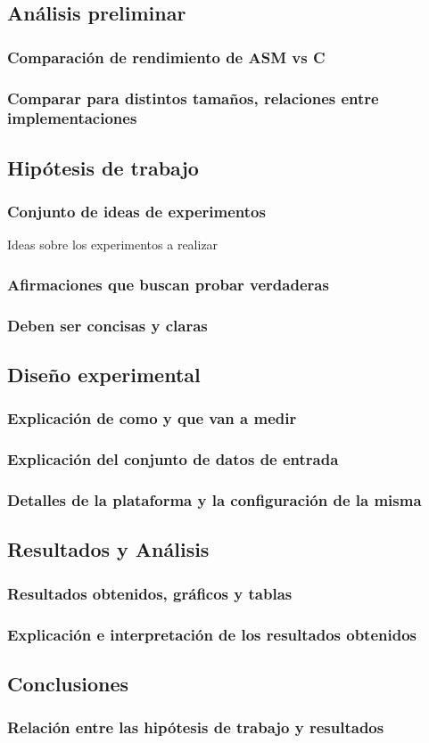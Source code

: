 \subsection{Análisis preliminar}
\subsubsection*{Comparación de rendimiento de ASM vs C}
\subsubsection*{Comparar para distintos tamaños, relaciones entre implementaciones}

\subsection{Hipótesis de trabajo}
\subsubsection*{Conjunto de ideas de experimentos}
Ideas sobre los experimentos a realizar 
\subsubsection*{Afirmaciones que buscan probar verdaderas}
\subsubsection*{Deben ser concisas y claras}

\subsection{Diseño experimental}
\subsubsection*{Explicación de como y que van a medir}
\subsubsection*{Explicación del conjunto de datos de entrada}
\subsubsection*{Detalles de la plataforma y la configuración de la misma}

\subsection{Resultados y Análisis}
\subsubsection*{Resultados obtenidos, gráficos y tablas}
\subsubsection*{Explicación e interpretación de los resultados obtenidos}

\subsection{Conclusiones}
\subsubsection*{Relación entre las hipótesis de trabajo y resultados}